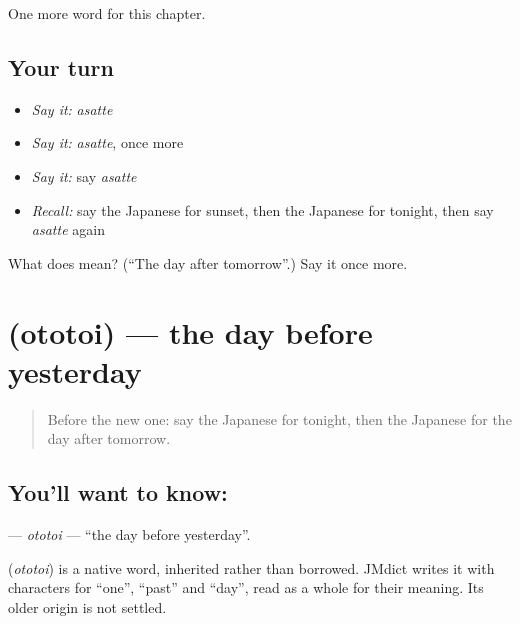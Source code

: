 \begin{grammarlens}[title={What you've built}]
One more word for this chapter.
\end{grammarlens}

\subsection*{Your turn}
\begin{itemize}
\raggedright
  \item \emph{Say it:} \emph{asatte}
  \item \emph{Say it:} \emph{asatte}, once more
  \item \emph{Say it:} say \emph{asatte}
  \item \emph{Recall:} say the Japanese for sunset, then the Japanese for tonight, then say \emph{asatte} again
\end{itemize}

\begin{tcolorbox}[breakable,colback=teal!4,colframe=teal!35!black,title={Before you move on}]
What does  mean? (\textquotedblleft{}The day after tomorrow\textquotedblright{}.) Say it once more.
\end{tcolorbox}
\section[\texorpdfstring{\ja{おととい} (ototoi)}{おととい (ototoi)}]{ (ototoi) — the day before yesterday}

\label{lesson:JA-C73-ototoi}



\begin{quote}
Before the new one: say the Japanese for tonight, then the Japanese for the day after tomorrow.
\end{quote}

\subsection*{You'll want to know: }
\textbf{} — \emph{ototoi} — \textquotedblleft{}the day before yesterday\textquotedblright{}.

\begin{cousinweb}
\textbf{} (\emph{ototoi}) is a native word, inherited rather than borrowed. JMdict writes it with characters for \textquotedblleft{}one\textquotedblright{}, \textquotedblleft{}past\textquotedblright{} and \textquotedblleft{}day\textquotedblright{}, read as a whole for their meaning. Its older origin is not settled.
\end{cousinweb}

